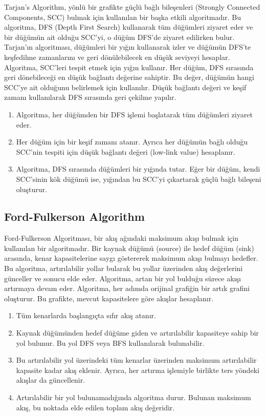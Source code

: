 Tarjan's Algorithm, yönlü bir grafikte güçlü bağlı bileşenleri (Strongly Connected Components, SCC) bulmak için kullanılan bir başka etkili algoritmadır. Bu algoritma, DFS (Depth First Search) kullanarak tüm düğümleri ziyaret eder ve bir düğümün ait olduğu SCC'yi, o düğüm DFS'de ziyaret edilirken bulur. Tarjan’ın algoritması, düğümleri bir yığın kullanarak izler ve düğümün DFS’te keşfedilme zamanlarını ve geri dönülebilecek en düşük seviyeyi hesaplar. Algoritma, SCC'leri tespit etmek için yığın kullanır. Her düğüm, DFS sırasında geri dönebileceği en düşük bağlantı değerine sahiptir. Bu değer, düğümün hangi SCC'ye ait olduğunu belirlemek için kullanılır. Düşük bağlantı değeri ve keşif zamanı kullanılarak DFS sırasında geri çekilme yapılır.

\begin{enumerate}
    \item Algoritma, her düğümden bir DFS işlemi başlatarak tüm düğümleri ziyaret eder.
    \item Her düğüm için bir keşif zamanı atanır. Ayrıca her düğümün bağlı olduğu SCC'nin tespiti için düşük bağlantı değeri (low-link value) hesaplanır.
    \item Algoritma, DFS sırasında düğümleri bir yığında tutar. Eğer bir düğüm, kendi SCC'sinin kök düğümü ise, yığından bu SCC'yi çıkartarak güçlü bağlı bileşeni oluşturur.
\end{enumerate}

\newpage

\subsection{Ford-Fulkerson Algorithm}

Ford-Fulkerson Algoritması, bir akış ağındaki maksimum akışı bulmak için kullanılan bir algoritmadır. Bir kaynak düğümü (source) ile hedef düğüm (sink) arasında, kenar kapasitelerine saygı göstererek maksimum akışı bulmayı hedefler. Bu algoritma, artırılabilir yollar bularak bu yollar üzerinden akış değerlerini günceller ve sonucu elde eder. Algoritma, artan bir yol bulduğu sürece akışı artırmaya devam eder. Algoritma, her adımda orijinal grafiğin bir artık grafini oluşturur. Bu grafikte, mevcut kapasitelere göre akışlar hesaplanır.

\begin{enumerate}
    \item Tüm kenarlarda başlangıçta sıfır akış atanır.
    \item Kaynak düğümünden hedef düğüme giden ve artırılabilir kapasiteye sahip bir yol bulunur. Bu yol DFS veya BFS kullanılarak bulunabilir.
    \item Bu artırılabilir yol üzerindeki tüm kenarlar üzerinden maksimum artırılabilir kapasite kadar akış eklenir. Ayrıca, her artırma işlemiyle birlikte ters yöndeki akışlar da güncellenir.
    \item Artırılabilir bir yol bulunamadığında algoritma durur. Bulunan maksimum akış, bu noktada elde edilen toplam akış değeridir.
\end{enumerate}

